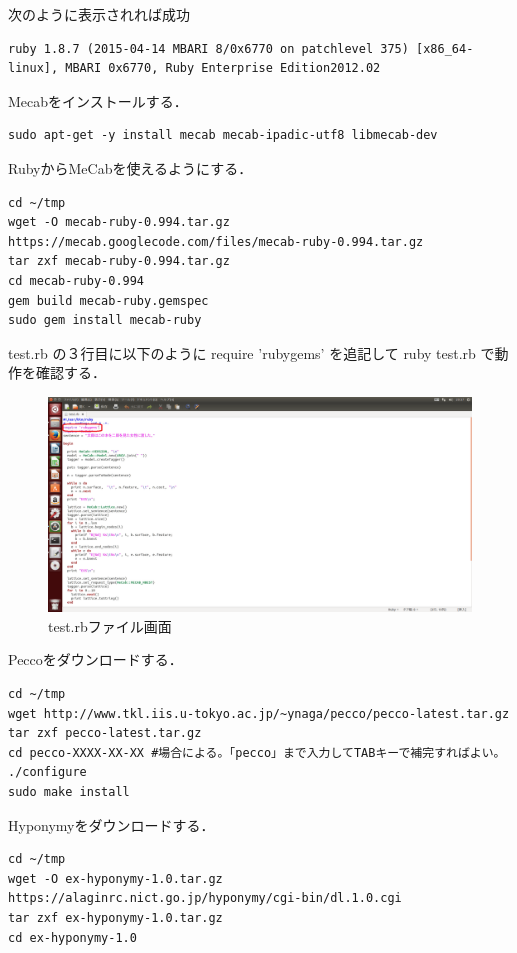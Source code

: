 次のように表示されれば成功
{\small
\begin{verbatim}
ruby 1.8.7 (2015-04-14 MBARI 8/0x6770 on patchlevel 375) [x86_64-linux], MBARI 0x6770, Ruby Enterprise Edition2012.02
\end{verbatim}}

Mecabをインストールする．
{\small
\begin{verbatim}
sudo apt-get -y install mecab mecab-ipadic-utf8 libmecab-dev
\end{verbatim}}

RubyからMeCabを使えるようにする．
{\small
\begin{verbatim}
cd ~/tmp
wget -O mecab-ruby-0.994.tar.gz https://mecab.googlecode.com/files/mecab-ruby-0.994.tar.gz
tar zxf mecab-ruby-0.994.tar.gz
cd mecab-ruby-0.994
gem build mecab-ruby.gemspec
sudo gem install mecab-ruby
\end{verbatim}}

 test.rb の３行目に以下のように require 'rubygems' を追記して ruby test.rb で動作を確認する．
\begin{figure}[hb]
\centering
\includegraphics[width=15cm]{testrb}
\caption{test.rbファイル画面}\label{testrb}
\end{figure}

Peccoをダウンロードする．
{\small
\begin{verbatim}
cd ~/tmp
wget http://www.tkl.iis.u-tokyo.ac.jp/~ynaga/pecco/pecco-latest.tar.gz
tar zxf pecco-latest.tar.gz
cd pecco-XXXX-XX-XX #場合による。「pecco」まで入力してTABキーで補完すればよい。
./configure
sudo make install
\end{verbatim}}

Hyponymyをダウンロードする．
{\small
\begin{verbatim}
cd ~/tmp
wget -O ex-hyponymy-1.0.tar.gz https://alaginrc.nict.go.jp/hyponymy/cgi-bin/dl.1.0.cgi
tar zxf ex-hyponymy-1.0.tar.gz
cd ex-hyponymy-1.0
\end{verbatim}}


